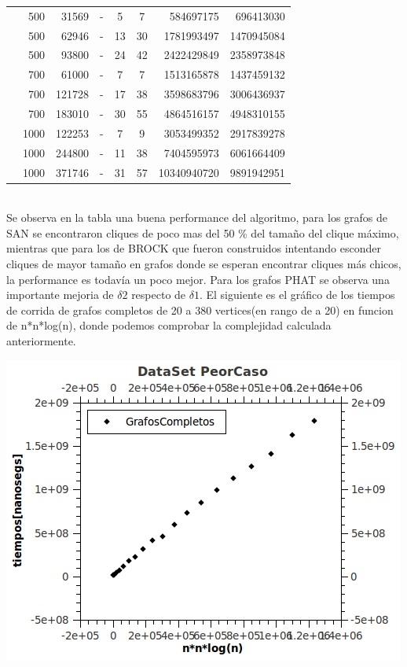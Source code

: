\begin{tabular}{|l|r|r|c|c|c|r|r|}
& 500& 31569& -& 5& 7&584697175 & 696413030\\
& 500& 62946& -& 13& 30&1781993497 & 1470945084\\
& 500& 93800& -& 24& 42&2422429849 &2358973848 \\
& 700& 61000& -& 7& 7&1513165878 & 1437459132\\
& 700& 121728& -& 17& 38&3598683796 & 3006436937\\
& 700& 183010& -& 30& 55&4864516157 & 4948310155 \\ 
& 1000& 122253& -& 7& 9&3053499352 & 2917839278\\
& 1000& 244800& -& 11& 38&7404595973 & 6061664409\\
& 1000& 371746& -& 31& 57&10340940720 & 9891942951\\
\hline 
\end{tabular} \\

Se observa en la tabla una buena performance del algoritmo, para los grafos de SAN se encontraron cliques de poco mas del 50 \% del tamaño del clique máximo, mientras que para los de BROCK que fueron construidos intentando esconder cliques de mayor tamaño en grafos donde se esperan encontrar cliques más chicos, la performance es todavía un poco mejor. 
Para los grafos PHAT se observa una importante mejoria de $\delta2$ respecto de $\delta1$. 
El siguiente es el gráfico de los tiempos de corrida de grafos completos de 20 a 380 vertices(en rango de a 20) en funcion de n*n*log(n), donde podemos comprobar la complejidad calculada anteriormente.
 
\includegraphics[scale=0.8]{HC/PeorCaso.png}


